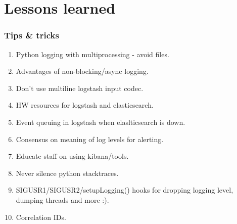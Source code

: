 \documentclass[13pt, ignorenonframetext]{beamer}
\begin{document}
\section{Lessons learned}
\begin{frame}
\frametitle{Tips \& tricks}
\begin{enumerate}
\item Python logging with multiprocessing - avoid files.
\item Advantages of non-blocking/async logging.
\item Don't use multiline logstash input codec.
\item HW resources for logstash and elasticsearch.
\item Event queuing in logstash when elaslticsearch is down.
\item Consensus on meaning of log levels for alerting.
\item Educate staff on using kibana/tools.
\item Never silence python stacktraces.
\item SIGUSR1/SIGUSR2/setupLogging() hooks for dropping logging level, dumping threads and more :).
\item Correlation IDs.
\end{enumerate}
\end{frame}


\end{document}
